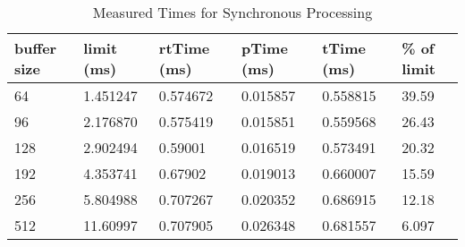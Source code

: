 \begin{table}[H]
\begin{center}
\begin{tabular}{ |p{1.4cm}||p{1.5cm}|p{1.7cm}|p{1.7cm}|p{1.6cm}|p{1.4cm}|  }
 \hline
 buffer size    & limit (ms)    & rtTime (ms)   & pTime (ms)    & tTime (ms) & \% of limit\\
 \hline
 64             & 1.451247      & 0.574672          & 0.015857          & 0.558815      & 39.59 \\
 96             & 2.176870      & 0.575419          & 0.015851          & 0.559568      & 26.43 \\
 128            & 2.902494      & 0.59001           & 0.016519          & 0.573491      & 20.32 \\
 192            & 4.353741      & 0.67902           & 0.019013          & 0.660007      & 15.59 \\
 256            & 5.804988      & 0.707267          & 0.020352          & 0.686915      & 12.18 \\
 512            & 11.60997      & 0.707905          & 0.026348          & 0.681557      & 6.097 \\
 \hline
\end{tabular}
\end{center}
\caption{Measured Times for Synchronous Processing}
\label{tab:latency_comp}
\end{table}